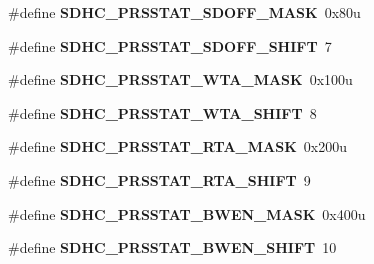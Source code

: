 \begin{DoxyCompactItemize}
\item 
\hypertarget{group___s_d_h_c___register___masks_ga97dde8a6d23e4744d4988349d9d6f581}{}\#define {\bfseries S\+D\+H\+C\+\_\+\+P\+R\+S\+S\+T\+A\+T\+\_\+\+S\+D\+O\+F\+F\+\_\+\+M\+A\+S\+K}~0x80u\label{group___s_d_h_c___register___masks_ga97dde8a6d23e4744d4988349d9d6f581}

\item 
\hypertarget{group___s_d_h_c___register___masks_ga8a5f8108789275435c30d3997c194b12}{}\#define {\bfseries S\+D\+H\+C\+\_\+\+P\+R\+S\+S\+T\+A\+T\+\_\+\+S\+D\+O\+F\+F\+\_\+\+S\+H\+I\+F\+T}~7\label{group___s_d_h_c___register___masks_ga8a5f8108789275435c30d3997c194b12}

\item 
\hypertarget{group___s_d_h_c___register___masks_gae6ab1f30d29da8d10ad0985318d09c30}{}\#define {\bfseries S\+D\+H\+C\+\_\+\+P\+R\+S\+S\+T\+A\+T\+\_\+\+W\+T\+A\+\_\+\+M\+A\+S\+K}~0x100u\label{group___s_d_h_c___register___masks_gae6ab1f30d29da8d10ad0985318d09c30}

\item 
\hypertarget{group___s_d_h_c___register___masks_ga52a878b9915b1b1dd257b24abb21a33f}{}\#define {\bfseries S\+D\+H\+C\+\_\+\+P\+R\+S\+S\+T\+A\+T\+\_\+\+W\+T\+A\+\_\+\+S\+H\+I\+F\+T}~8\label{group___s_d_h_c___register___masks_ga52a878b9915b1b1dd257b24abb21a33f}

\item 
\hypertarget{group___s_d_h_c___register___masks_gad374f3cdffc3be8138708bf632b303be}{}\#define {\bfseries S\+D\+H\+C\+\_\+\+P\+R\+S\+S\+T\+A\+T\+\_\+\+R\+T\+A\+\_\+\+M\+A\+S\+K}~0x200u\label{group___s_d_h_c___register___masks_gad374f3cdffc3be8138708bf632b303be}

\item 
\hypertarget{group___s_d_h_c___register___masks_gaad64c483eb2e6b6fc96cd466772b1af5}{}\#define {\bfseries S\+D\+H\+C\+\_\+\+P\+R\+S\+S\+T\+A\+T\+\_\+\+R\+T\+A\+\_\+\+S\+H\+I\+F\+T}~9\label{group___s_d_h_c___register___masks_gaad64c483eb2e6b6fc96cd466772b1af5}

\item 
\hypertarget{group___s_d_h_c___register___masks_ga59c9cd5ee08a703b51a4487e721cfdac}{}\#define {\bfseries S\+D\+H\+C\+\_\+\+P\+R\+S\+S\+T\+A\+T\+\_\+\+B\+W\+E\+N\+\_\+\+M\+A\+S\+K}~0x400u\label{group___s_d_h_c___register___masks_ga59c9cd5ee08a703b51a4487e721cfdac}

\item 
\hypertarget{group___s_d_h_c___register___masks_ga2a8af22b9f8230f46db9118a7f4a2f62}{}\#define {\bfseries S\+D\+H\+C\+\_\+\+P\+R\+S\+S\+T\+A\+T\+\_\+\+B\+W\+E\+N\+\_\+\+S\+H\+I\+F\+T}~10\label{group___s_d_h_c___register___masks_ga2a8af22b9f8230f46db9118a7f4a2f62}


\end{DoxyCompactItemize}
